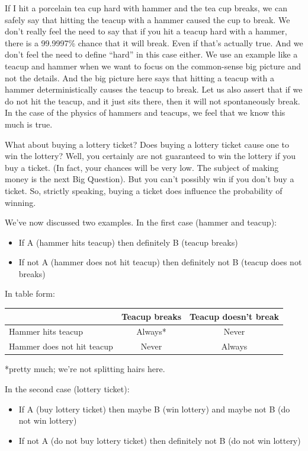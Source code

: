 \documentclass[openany]{book}
\providecommand{\tightlist}{%
  \setlength{\itemsep}{0pt}\setlength{\parskip}{0pt}}
\begin{document}
If I hit a porcelain tea cup hard with hammer and the tea cup breaks, we can safely say that hitting the teacup with a hammer caused the cup to break. We don't really feel the need to say that if you hit a teacup hard with a hammer, there is a 99.9997\% chance that it will break. Even if that's actually true. And we don't feel the need to define ``hard'' in this case either. We use an example like a teacup and hammer when we want to focus on the common-sense big picture and not the details. And the big picture here says that hitting a teacup with a hammer deterministically causes the teacup to break. Let us also assert that if we do not hit the teacup, and it just sits there, then it will not spontaneously break. In the case of the physics of hammers and teacups, we feel that we know this much is true.

What about buying a lottery ticket? Does buying a lottery ticket cause one to win the lottery? Well, you certainly are not guaranteed to win the lottery if you buy a ticket. (In fact, your chances will be very low. The subject of making money is the next Big Question). But you can't possibly win if you don't buy a ticket. So, strictly speaking, buying a ticket does influence the probability of winning.

We've now discussed two examples. In the first case (hammer and teacup):

\begin{itemize}
\tightlist
\item
  If A (hammer hits teacup) then definitely B (teacup breaks)
\item
  If not A (hammer does not hit teacup) then definitely not B (teacup does not breaks)
\end{itemize}

In table form:

\begin{longtable}[]{@{}lcc@{}}
\toprule
& Teacup breaks & Teacup doesn't break\tabularnewline
\midrule
\endhead
Hammer hits teacup & Always* & Never\tabularnewline
Hammer does not hit teacup & Never & Always\tabularnewline
\bottomrule
\end{longtable}

*pretty much; we're not splitting hairs here.

In the second case (lottery ticket):

\begin{itemize}
\tightlist
\item
  If A (buy lottery ticket) then maybe B (win lottery) and maybe not B (do not win lottery)
\item
  If not A (do not buy lottery ticket) then definitely not B (do not win lottery)
\end{itemize}
\end{document}
